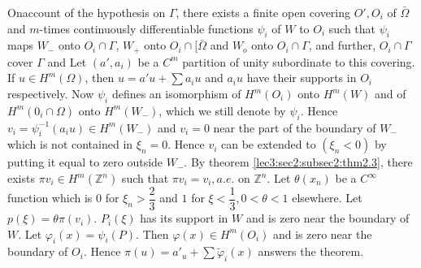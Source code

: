 On\pageoriginale account of the hypothesis on $\Gamma$, there exists a finite open covering
$O', O_i$ of $\bar{\Omega}$ and $m$-times continuously differentiable
functions $\psi _i$ of $W$ to $O_i$ such that $\psi_i$ maps $W_-$ onto
$O_i \cap \Gamma$, $W_+$ onto $O_i \cap [ \bar{\Omega}$ and $W_o$ onto
  $O_i \cap \Gamma$, and further, $O_i \cap \Gamma$ cover $\Gamma$ and
  Let $(a' ,a_i)$ be a $C^m$ partition of unity subordinate to this
  covering. If $u \in H^m (\Omega)$, then $u=a'u + \sum a_i u$
  and $a_i u$ have their supports in $O_i$ respectively. Now $\psi _i$
  defines an isomorphism of $H^m(O_i)$ onto $H^m(W)$ and of $H^m(0_i
  \cap \Omega)$ onto $H^m(W_-)$, which we still denote by
  $\psi_i$. Hence $v_i = \psi^{-1}_i (a_i u) \in H^m (W_-)$
  and $v_i=0$ near the part of the boundary of $W_-$ which is not
  contained in $\xi_n=0$. Hence $v_i$ can be extended to $(\xi_n <0)$
  by putting it equal to zero outside $W_-$. By theorem    \ref{lec3:sec2:subsec2:thm2.3}, there
  exists $\pi v_i \in H^m (\mathbb{Z}^n)$ such that $\pi v_i=v_i,
  a.e$. on $\mathbb{Z}^n$. Let $\theta (x_n)$ be a $C^\infty$ function
  which is $0$ for $\xi_n > \dfrac{2}{3}$ and $1$ for $\xi<
  \dfrac{1}{3},0 <\theta < 1$ elsewhere. Let $p(\xi)= \theta \pi
  (v_i)$. $P_i(\xi)$ has its support in $W$ and is zero near the
  boundary of $W$. Let $\varphi _i (x)=\psi_i(P)$. Then $\varphi (x)
  \in H^m(O_i)$ and is zero near the boundary of $O_i$. Hence
  $\pi (u)=a'_u+ \sum \tilde{ \varphi}_i (x)$ answers the
  theorem. 

